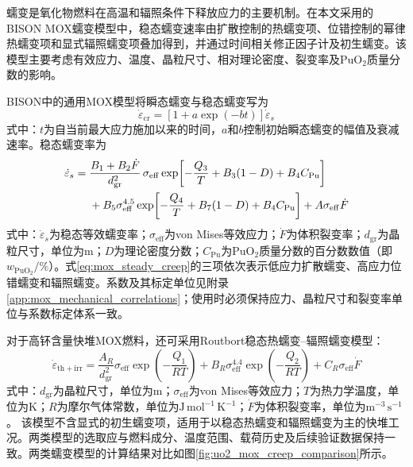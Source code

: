 蠕变是氧化物燃料在高温和辐照条件下释放应力的主要机制。在本文采用的BISON MOX蠕变模型中，稳态蠕变速率由扩散控制的热蠕变项、位错控制的幂律热蠕变项和显式辐照蠕变项叠加得到，并通过时间相关修正因子计及初生蠕变。该模型主要考虑有效应力、温度、晶粒尺寸、相对理论密度、裂变率及$\mathrm{PuO}_2$质量分数的影响。

BISON中的通用MOX模型将瞬态蠕变与稳态蠕变写为\cite{halesBISONTheoryManual2016,MiletJNM1983}
\begin{equation}
	\dot{\varepsilon}_{\mathrm{cr}}
	=\left[1+a\exp(-bt)\right]\dot{\varepsilon}_{s}
	\label{eq:mox_transient_creep}
\end{equation}
式中：$t$为自当前最大应力施加以来的时间，$a$和$b$控制初始瞬态蠕变的幅值及衰减速率。稳态蠕变率为
\begin{align}
	\dot{\varepsilon}_{s}
	={}&\frac{B_1+B_2\dot{F}}{d_{\mathrm{gr}}^2}\,
	\sigma_{\mathrm{eff}}
	\exp\!\left[-\frac{Q_3}{T}+B_3(1-D)+B_4C_{\mathrm{Pu}}\right]
	\notag\\
	&+B_5\sigma_{\mathrm{eff}}^{4.5}
	\exp\!\left[-\frac{Q_4}{T}+B_7(1-D)+B_4C_{\mathrm{Pu}}\right]
	+A\sigma_{\mathrm{eff}}\dot{F}
	\label{eq:mox_steady_creep}
\end{align}
式中：$\dot{\varepsilon}_{s}$为稳态等效蠕变率；$\sigma_{\mathrm{eff}}$为von Mises等效应力；$\dot{F}$为体积裂变率；$d_{\mathrm{gr}}$为晶粒尺寸，单位为$\mathrm{m}$；$D$为理论密度分数；$C_{\mathrm{Pu}}$为$\mathrm{PuO}_2$质量分数的百分数数值（即$w_{\mathrm{PuO}_2}/\%$）。式\eqref{eq:mox_steady_creep}的三项依次表示低应力扩散蠕变、高应力位错蠕变和辐照蠕变。系数及其标定单位见附录\ref{app:mox_mechanical_correlations}；使用时必须保持应力、晶粒尺寸和裂变率单位与系数标定体系一致。

对于高钚含量快堆MOX燃料，还可采用Routbort稳态热蠕变--辐照蠕变模型：
\begin{equation}
	\dot{\varepsilon}_{\mathrm{th+irr}}
	=\frac{A_R}{d_{\mathrm{gr}}^2}\sigma_{\mathrm{eff}}
	\exp\!\left(-\frac{Q_1}{RT}\right)
	+B_R\sigma_{\mathrm{eff}}^{4.4}
	\exp\!\left(-\frac{Q_2}{RT}\right)
	+C_R\sigma_{\mathrm{eff}}\dot{F}
	\label{eq:fast_mox_creep}
\end{equation}
式中：$d_{\mathrm{gr}}$为晶粒尺寸，单位为$\mathrm{m}$；$\sigma_{\mathrm{eff}}$为von Mises等效应力；$T$为热力学温度，单位为$\mathrm{K}$；$R$为摩尔气体常数，单位为$\mathrm{J\,mol^{-1}\,K^{-1}}$；$\dot F$为体积裂变率，单位为$\mathrm{m^{-3}\,s^{-1}}$。
该模型不含显式的初生蠕变项，适用于以稳态热蠕变和辐照蠕变为主的快堆工况。两类模型的选取应与燃料成分、温度范围、载荷历史及后续验证数据保持一致。两类蠕变模型的计算结果对比如图\ref{fig:uo2_mox_creep_comparison}所示。

